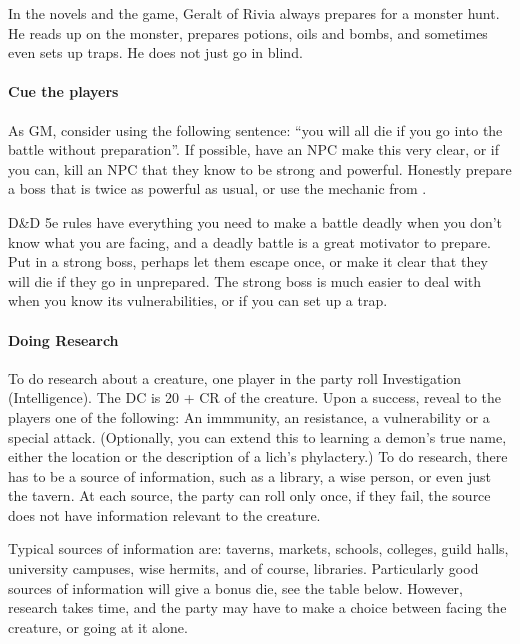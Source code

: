 \documentclass[twocolumn]{dndbook}
\begin{document}
\begin{emphasisParagraph}
	In the novels and the game, Geralt of Rivia always prepares for a monster hunt.
	He reads up on the monster, prepares potions, oils and bombs,
	and sometimes even sets up traps.
	He does not just go in blind.
\end{emphasisParagraph}

\paragraph*{Cue the players}
As GM, consider using the following sentence: ``you will all die if you go into the battle without preparation''.
If possible, have an NPC make this very clear, or if you can, kill an NPC that they know to be strong and powerful.
Honestly prepare a boss that is twice as powerful as usual, or use the mechanic from .\par

\begin{emphasisParagraph}
	D\&D 5e rules have everything you need to make a battle deadly when you don't know what you are facing,
	and a deadly battle is a great motivator to prepare.
	Put in a strong boss, perhaps let them escape once, or make it clear that they will die if they go in unprepared.
	The strong boss is much easier to deal with when you know its vulnerabilities,
	or if you can set up a trap.
\end{emphasisParagraph}

\paragraph*{Doing Research}

To do research about a creature, one player in the party roll Investigation (Intelligence).
The DC is 20 + CR of the creature.
Upon a success, reveal to the players one of the following: An immmunity, an resistance, a vulnerability or a special attack.
(Optionally, you can extend this to learning a demon's true name, either the location or the description of a lich's phylactery.)
To do research, there has to be a source of information, such as a library, a wise person, or even just the tavern.
At each source, the party can roll only once, if they fail, the source does not have information relevant to the creature.\par

Typical sources of information are: taverns, markets, schools, colleges, guild halls, university campuses, wise hermits, and of course, libraries.
Particularly good sources of information will give a bonus die, see the table below.
However, research takes time, and the party may have to make a choice between facing the creature, or going at it alone.\par
\end{document}
